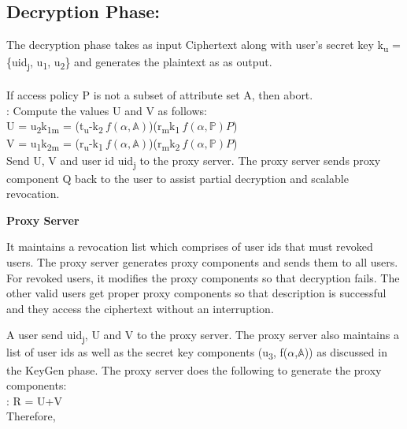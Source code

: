 \documentclass[conference]{IEEEtran}
\begin{document}
{\subsection{\textbf {Decryption Phase: }}

The decryption phase takes as input Ciphertext along with user's secret key k\textsubscript{u} = \{uid\textsubscript{j}, u\textsubscript{1}, u\textsubscript{2}\} and generates the plaintext as as output. \\
{\color{red}{Change the following to itemize and equations}} \\
 If access policy P is not a subset of attribute set A, then abort.\\

 : Compute the values U and V as follows:\\

U = u\textsubscript{2}k\textsubscript{1m} = (t\textsubscript{u}-k\textsubscript{2}$\ f(\alpha,\mathbb{A})$)(r\textsubscript{m}k\textsubscript{1}$\ f(\alpha,\mathbb{P})P$)\\

V = u\textsubscript{1}k\textsubscript{2m} = (r\textsubscript{u}-k\textsubscript{1}$\ f(\alpha,\mathbb{A})$)(r\textsubscript{m}k\textsubscript{2}$\ f(\alpha,\mathbb{P})P$)\\

Send U, V and user id uid\textsubscript{j} to the proxy server. The proxy server sends proxy component Q back to the user to assist partial decryption and scalable revocation. \\

\par \textbf {Proxy Server }
\par It maintains a revocation list which comprises of user ids that must revoked users. The proxy server generates proxy components and sends them to all users. For revoked users, it modifies the proxy components so that decryption fails. The other valid users get proper proxy components so that description is successful and they access the ciphertext without an interruption.

\par A user send uid\textsubscript{j}, U and V to the proxy server.
The proxy server also maintains a list of user ids as well as the secret key components (u\textsubscript{3}, f($\alpha$,$\mathbb{A}$)) as discussed in the KeyGen phase.
The proxy server does the following to generate the proxy components: \\
 :
R = U+V \\
Therefore,\\

}
\end{document}
